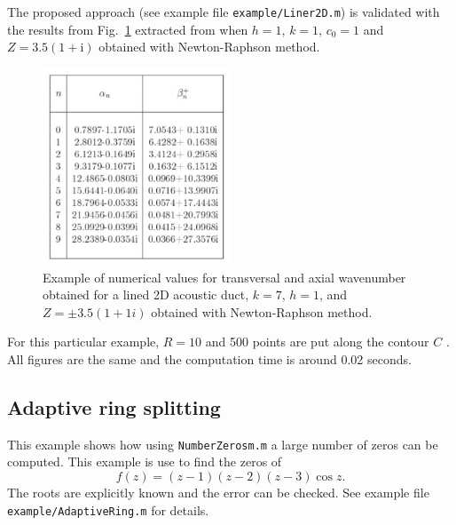 \documentclass[a4paper,10pt]{article}
\renewcommand{\i}{\mathrm{i}}
\begin{document}
The proposed approach (see example file \texttt{example/Liner2D.m}) is validated with the results from Fig.~\ref{fig:sri} extracted from \cite{Poernomo:2008} when $h=1$, $k=1$, $c_0=1$ and $Z=3.5(1+\i)$  obtained with Newton-Raphson method.


%


\begin{figure}
	\centering
		\includegraphics[width=0.50\textwidth]{sri.pdf}
	\caption{Example of numerical values\cite{Poernomo:2008} for transversal and axial wavenumber obtained for a lined 2D acoustic duct, $k=7$, $h=1$, and $Z=\pm 3.5(1+1i)$ obtained with Newton-Raphson method.}
	\label{fig:sri}
\end{figure}

For this particular example,  $R=10$ and 500 points are put along the contour $C$ . All figures are the same and the computation time is around 0.02 seconds.

\subsection{Adaptive ring splitting}
This example shows how using \texttt{NumberZerosm.m} a large number of zeros can be computed. This example is use to find the zeros of 
\begin{equation}
f(z) = (z-1)(z-2)(z-3)\cos z .
\end{equation}
The roots are explicitly known and the error can be checked. See example file \texttt{example/AdaptiveRing.m} for details.



\end{document}
